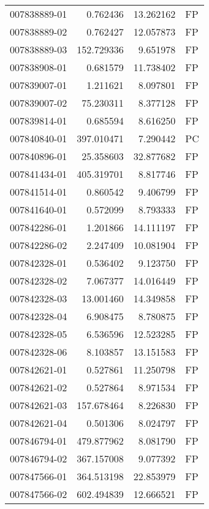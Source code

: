 \begin{tabular}{lrrl}
007838889-01 &    0.762436 &      13.262162 &   FP \\
007838889-02 &    0.762427 &      12.057873 &   FP \\
007838889-03 &  152.729336 &       9.651978 &   FP \\
007838908-01 &    0.681579 &      11.738402 &   FP \\
007839007-01 &    1.211621 &       8.097801 &   FP \\
007839007-02 &   75.230311 &       8.377128 &   FP \\
007839814-01 &    0.685594 &       8.616250 &   FP \\
007840840-01 &  397.010471 &       7.290442 &   PC \\
007840896-01 &   25.358603 &      32.877682 &   FP \\
007841434-01 &  405.319701 &       8.817746 &   FP \\
007841514-01 &    0.860542 &       9.406799 &   FP \\
007841640-01 &    0.572099 &       8.793333 &   FP \\
007842286-01 &    1.201866 &      14.111197 &   FP \\
007842286-02 &    2.247409 &      10.081904 &   FP \\
007842328-01 &    0.536402 &       9.123750 &   FP \\
007842328-02 &    7.067377 &      14.016449 &   FP \\
007842328-03 &   13.001460 &      14.349858 &   FP \\
007842328-04 &    6.908475 &       8.780875 &   FP \\
007842328-05 &    6.536596 &      12.523285 &   FP \\
007842328-06 &    8.103857 &      13.151583 &   FP \\
007842621-01 &    0.527861 &      11.250798 &   FP \\
007842621-02 &    0.527864 &       8.971534 &   FP \\
007842621-03 &  157.678464 &       8.226830 &   FP \\
007842621-04 &    0.501306 &       8.024797 &   FP \\
007846794-01 &  479.877962 &       8.081790 &   FP \\
007846794-02 &  367.157008 &       9.077392 &   FP \\
007847566-01 &  364.513198 &      22.853979 &   FP \\
007847566-02 &  602.494839 &      12.666521 &   FP \\

\end{tabular}
